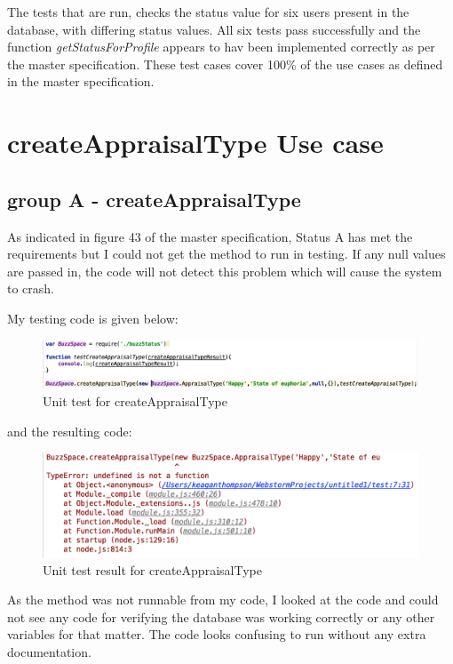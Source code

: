 \documentclass[a4paper,12pt]{article}
\begin{document}
The tests that are run, checks the status value for six users present in the database, with differing status values. All six tests pass successfully and the function \textit{getStatusForProfile} appears to hav been implemented correctly as per the master specification. These test cases cover 100\% of the use cases as defined in the master specification.

\newpage
\section{createAppraisalType Use case}
\subsection{group A - createAppraisalType}

As indicated in figure 43 of the master specification, Status A has met the requirements 
but I could not get the method to run in testing. If any null values are passed in, the code will not 
detect this problem which will cause the system to crash.

My testing code is given below:

 \begin{figure}[H]
 	\centering
 	\includegraphics[width=1.0\textwidth]{Figures/KTCode.png}
 	\caption{Unit test for createAppraisalType}
 \end{figure}
 
 and the resulting code:
 
 \begin{figure}[H]
 	\centering
 	\includegraphics[width=1.0\textwidth]{Figures/KTError.png}
 	\caption{Unit test result for createAppraisalType}
 \end{figure}
 
 As the method was not runnable from my code, I looked at the code and could not see any code for verifying
 the database was working correctly or any other variables for that matter. The code looks confusing to run
 without any extra documentation.
\end{document}

